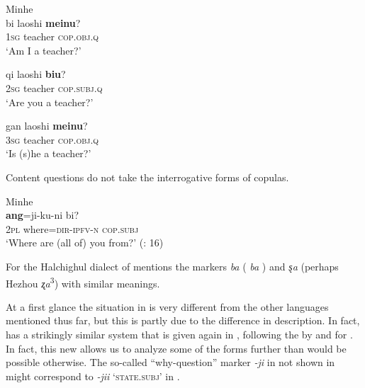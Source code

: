\newpage 
\ea%
    \label{ex:mong:59}
    Minhe \\
    \ea
    \gll bi  laoshi \textbf{{meinu}}?\\
    1\textsc{sg}  teacher    \textsc{cop}.\textsc{obj}.\textsc{q}\\
    \glt ‘Am I a teacher?’
    
    \ex
    \gll qi  laoshi \textbf{{biu}}?\\
    2\textsc{sg}  teacher    \textsc{cop}.\textsc{subj}.\textsc{q}\\
    \glt ‘Are you a teacher?’
    
    \ex
    \gll gan  laoshi \textbf{{meinu}}?\\
    3\textsc{sg}  teacher    \textsc{cop}.\textsc{obj}.\textsc{q}\\
    \glt ‘Is (s)he a teacher?’ \citep[199]{Slater2003a}\z\z

Content questions do not take the interrogative forms of copulas.

\ea%
    \label{ex:mong:60}
    Minhe \\
     \textbf{{ang}}=ji-ku-ni    bi?\\
    2\textsc{pl}  where=\textsc{dir}-\textsc{ipfv}-\textsc{n}  \textsc{cop}.\textsc{subj}\\
    \glt ‘Where are (all of) you from?’ (\citealt{ChenZhaojun2005}: 16)
    \z

For the Halchighul dialect of  \citet[61]{Zhaonasitu1981a} mentions the markers \textit{ba} ( \textit{ba} ) and \textit{ȿa} (perhaps Hezhou \textit{ʐa}\textsuperscript{3}) with similar meanings.

At a first glance the situation in  is very different from the other languages mentioned thus far, but this is partly due to the difference in description. In fact,  has a strikingly similar system that is given again in , following the  by \citet[316]{Slater2003b} and \citet[386f.]{Dixon2012} for . In fact, this new  allows us to analyze some of the forms further than would be possible otherwise. The so-called “why-question” marker \textit{-ji} in  not shown in  might correspond to \textit{-jii} ‘\textsc{state.subj}’ in .


